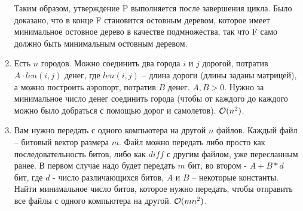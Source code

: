 \begin{enumerate}
\begin{solution}
      Таким образом, утверждение P выполняется после завершения цикла. Было доказано, что в конце F становится остовным деревом, которое имеет минимальное остовное дерево в качестве подмножества, так что F само должно быть минимальным остовным деревом.
    \end{solution}
    
  \item
     Есть $n$ городов. Можно соединить два города $i$ и $j$ дорогой, потратив $A \cdot len(i, j)$
     денег, где $len(i, j)$ -- длина дороги (длины заданы матрицей), а можно построить аэропорт,
     потратив $B$ денег. $A, B > 0$. Нужно за минимальное число денег соединить города
     (чтобы от каждого до каждого можно было добраться с помощью дорог и самолетов). $\mathcal{O}(n^2)$.

  \item
    Вам нужно передать с одного компьютера на другой $n$ файлов. Каждый файл -- битовый вектор
    размера $m$. Файл можно передать либо просто как последовательность битов, либо как $diff$
    с другим файлом, уже пересланным ранее. В первом случае надо будет передать $m$ бит, во
    втором - $A+B*d$ бит, где $d$ - число различающихся битов, $A$ и $B$ -- некоторые
    константы. Найти минимальное число битов, которое нужно передать, чтобы отправить все
    файлы с одного компьютера на другой. $\mathcal{O}(mn^2)$.

	
\end{enumerate}
